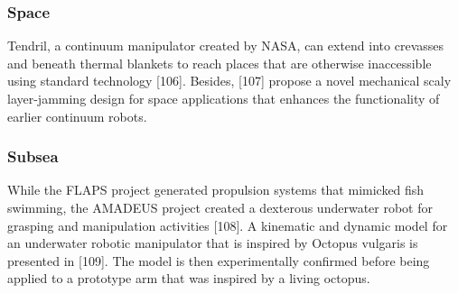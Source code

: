 \documentclass[12pt,twoside,a4]{mwbk}
\begin{document}
\subsubsection{Space}
Tendril, a continuum manipulator created by NASA, can extend into crevasses and beneath thermal blankets to reach places that are otherwise inaccessible using standard technology [106]. Besides, [107] propose a novel mechanical scaly layer-jamming design for space applications that enhances the functionality of earlier continuum robots.
\subsubsection{Subsea}
While the FLAPS project generated propulsion systems that mimicked fish swimming, the AMADEUS project created a dexterous underwater robot for grasping and manipulation activities [108]. A kinematic and dynamic model for an underwater robotic manipulator that is inspired by Octopus vulgaris is presented in [109]. The model is then experimentally confirmed before being applied to a prototype arm that was inspired by a living octopus.
\end{document}
